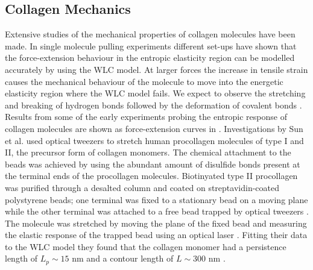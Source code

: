 

\subsection{Collagen Mechanics}

Extensive studies of the mechanical properties of collagen molecules have been made. In single molecule pulling experiments different set-ups have shown that the force-extension behaviour in the entropic elasticity region can be modelled accurately by using the WLC model. At larger forces the increase in tensile strain causes the mechanical behaviour of the molecule to move into the energetic elasticity region where the WLC model fails. We expect to observe the stretching and breaking of hydrogen bonds followed by the deformation of covalent bonds \cite{Buehler2007}. Results from some of the early experiments probing the entropic response of collagen molecules are shown as force-extension curves in . Investigations by Sun et al. used optical tweezers to stretch human procollagen molecules of type I and II, the precursor form of collagen monomers. The chemical attachment to the beads was achieved by using the abundant amount of disulfide bonds present at the terminal ends of the procollagen molecules. Biotinyated type II procollagen was purified through a desalted column and coated on streptavidin-coated polystyrene beads; one terminal was fixed to a stationary bead on a moving plane while the other terminal was attached to a free bead trapped by optical tweezers \cite{Sun2004}. The molecule was stretched by moving the plane of the fixed bead and measuring the elastic response of the trapped bead using an optical laser \cite{Sun2001}. Fitting their data to the WLC model they found that the collagen monomer had a persistence length of $L_{p} \sim 15 \text{ nm}$ and a contour length of $L \sim 300 \text{ nm}$ \cite{Sun2001,Sun2004}.

